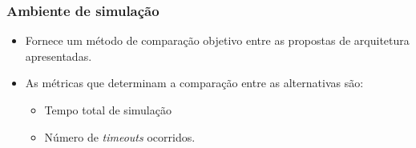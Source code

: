\begin{frame}
    \frametitle{Ambiente de simulação}
    \begin{itemize}
      \item Fornece um método de comparação objetivo entre as propostas de arquitetura apresentadas.
      \item As métricas que determinam a comparação entre as alternativas são:
      \begin{itemize}
        \item Tempo total de simulação
        \item Número de \textit{timeouts} ocorridos.
      \end{itemize}  
    \end{itemize}  
\end{frame}  


